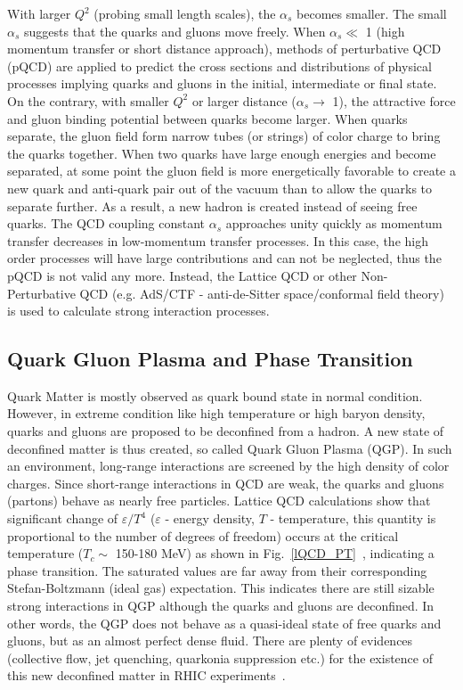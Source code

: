With larger $Q^{2}$ (probing small length scales), the $\alpha_{s}$ becomes smaller. The small $\alpha_{s}$ suggests that the quarks and gluons move freely. When $\alpha_{s}\ll$ 1 (high momentum transfer or short distance approach), methods of perturbative QCD (pQCD) are applied to predict the cross sections and distributions of physical processes implying quarks and gluons in the initial, intermediate or final state. On the contrary, with smaller $Q^{2}$ or larger distance ($\alpha_{s}\rightarrow$ 1), the attractive force and gluon binding potential between quarks become larger. When quarks separate, the gluon field form narrow tubes (or strings) of color charge to bring the quarks together. When two quarks have large enough energies and become separated, at some point the gluon field is more energetically favorable to create a new quark and anti-quark pair out of the vacuum than to allow the quarks to separate further. As a result, a new hadron is created instead of seeing free quarks. The QCD coupling constant $\alpha_{s}$ approaches unity quickly as momentum transfer decreases in low-momentum transfer processes. In this case, the high order processes will have large contributions and can not be neglected, thus the pQCD is not valid any more. Instead, the Lattice QCD or other Non-Perturbative QCD (e.g. AdS/CTF - anti-de-Sitter space/conformal field theory) is used to calculate strong interaction processes.

\subsection{Quark Gluon Plasma and Phase Transition}
Quark Matter is mostly observed as quark bound state in normal condition. However, in extreme condition like high temperature or high baryon density, quarks and gluons are proposed to be deconfined from a hadron. A new state of deconfined matter is thus created, so called Quark Gluon Plasma (QGP). In such an environment, long-range interactions are screened by the high density of color charges. Since short-range interactions in QCD are weak, the quarks and gluons (partons) behave as nearly free particles. Lattice QCD calculations show that significant change of $\varepsilon/T^{4}$ ($\varepsilon$ - energy density, $T$ - temperature, this quantity is proportional to the number of degrees of freedom) occurs at the critical temperature ($T_{c}\sim$ 150-180 MeV) as shown in Fig.~\ref{lQCD_PT}~\cite{LQCDPhaseTransistion}, indicating a phase transition. The saturated values are far away from their corresponding Stefan-Boltzmann (ideal gas) expectation. This indicates there are still sizable strong interactions in QGP although the quarks and gluons are deconfined. In other words, the QGP does not behave as a quasi-ideal state of free quarks and gluons, but as an almost perfect dense fluid. There are plenty of evidences (collective flow, jet quenching, quarkonia suppression etc.) for the existence of this new deconfined matter in RHIC experiments~\cite{STARwp,PHENIXwp,PHOBOSwp,BRAHMSwp}.


